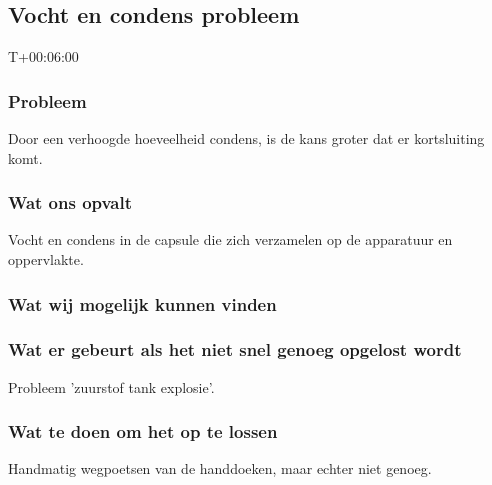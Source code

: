 \subsection{Vocht en condens probleem}
T+00:06:00

\subsubsection{Probleem}
Door een verhoogde hoeveelheid condens, is de kans groter dat er kortsluiting komt.

\subsubsection{Wat ons opvalt}
Vocht en condens in de capsule die zich verzamelen op de apparatuur en oppervlakte.

\subsubsection{Wat wij mogelijk kunnen vinden}

\subsubsection{Wat er gebeurt als het niet snel genoeg opgelost wordt}
Probleem 'zuurstof tank explosie'.

\subsubsection{Wat te doen om het op te lossen}
Handmatig wegpoetsen van de handdoeken, maar echter niet genoeg.